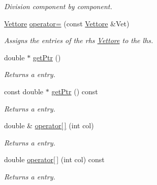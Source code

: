 \begin{DoxyCompactItemize}
\begin{DoxyCompactList}\small\item\em \-Division component by component. \end{DoxyCompactList}\item 
\hypertarget{classVettore_ae984a878df7082f220fe8512856f843d}{\hyperlink{classVettore}{\-Vettore} \hyperlink{classVettore_ae984a878df7082f220fe8512856f843d}{operator=} (const \hyperlink{classVettore}{\-Vettore} \&\-Vet)}\label{classVettore_ae984a878df7082f220fe8512856f843d}

\begin{DoxyCompactList}\small\item\em \-Assigns the entries of the rhs \hyperlink{classVettore}{\-Vettore} to the lhs. \end{DoxyCompactList}\item 
\hypertarget{classVettore_acde0dec95305cc462f912016373a77fe}{double $\ast$ \hyperlink{classVettore_acde0dec95305cc462f912016373a77fe}{get\-Ptr} ()}\label{classVettore_acde0dec95305cc462f912016373a77fe}

\begin{DoxyCompactList}\small\item\em \-Returns a entry. \end{DoxyCompactList}\item 
\hypertarget{classVettore_ac9628a8286213402e12603779d7fe5ae}{const double $\ast$ \hyperlink{classVettore_ac9628a8286213402e12603779d7fe5ae}{get\-Ptr} () const }\label{classVettore_ac9628a8286213402e12603779d7fe5ae}

\begin{DoxyCompactList}\small\item\em \-Returns a entry. \end{DoxyCompactList}\item 
\hypertarget{classVettore_a1928a371eb2c20841b3916ba9824b8a4}{double \& \hyperlink{classVettore_a1928a371eb2c20841b3916ba9824b8a4}{operator\mbox{[}$\,$\mbox{]}} (int col)}\label{classVettore_a1928a371eb2c20841b3916ba9824b8a4}

\begin{DoxyCompactList}\small\item\em \-Returns a entry. \end{DoxyCompactList}\item 
\hypertarget{classVettore_af57ef48295a3c4e8f3379287f2a7e687}{double \hyperlink{classVettore_af57ef48295a3c4e8f3379287f2a7e687}{operator\mbox{[}$\,$\mbox{]}} (int col) const }\label{classVettore_af57ef48295a3c4e8f3379287f2a7e687}

\begin{DoxyCompactList}\small\item\em \-Returns a entry. \end{DoxyCompactList}\end{DoxyCompactItemize}
